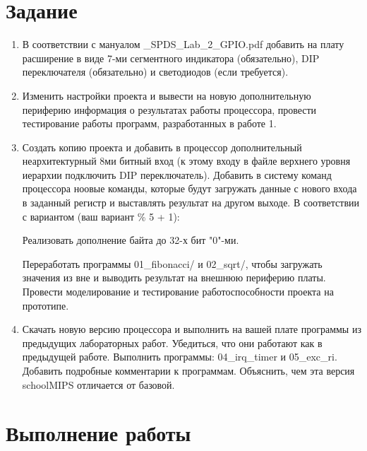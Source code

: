 \documentclass[a4paper,14pt]{article}
\begin{document}
	
	\tableofcontents
	\pagebreak
	\section{Задание}
	
	\begin{enumerate}
		\item В соответствии с мануалом \_SPDS\_Lab\_2\_GPIO.pdf добавить на плату расширение в виде 7-ми сегментного индикатора (обязательно), DIP переключателя (обязательно) и светодиодов (если требуется).
		
		\item Изменить настройки проекта и вывести на новую дополнительную периферию информация о результатах работы процессора, провести тестирование работы программ, разработанных в работе 1.
		
		\item Создать  копию проекта и добавить в процессор дополнительный неархитектурный 8ми битный вход (к этому входу в файле верхнего уровня иерархии подключить DIP переключатель). Добавить в систему команд процессора ноовые команды, которые будут загружать данные с нового входа в заданный регистр и выставлять результат на другом выходе. В соответствии с вариантом (ваш вариант \% 5 + 1):
		
		Реализовать дополнение байта до 32-х бит "0"-ми.
		
		Переработать программы 01\_fibonacci/ и 02\_sqrt/, чтобы загружать значения из вне и выводить результат на внешнюю периферию платы. Провести моделирование и тестирование работоспособности проекта на прототипе.
		
		\item Скачать новую версию процессора и выполнить на вашей плате программы из предыдущих лабораторных работ. Убедиться, что они работают как в предыдущей работе. Выполнить программы: 04\_irq\_timer и 05\_exc\_ri. Добавить подробные комментарии к программам. Объяснить, чем эта версия schoolMIPS отличается от базовой.
	\end{enumerate}

	
	\section{Выполнение работы}
	
	
\end{document}
